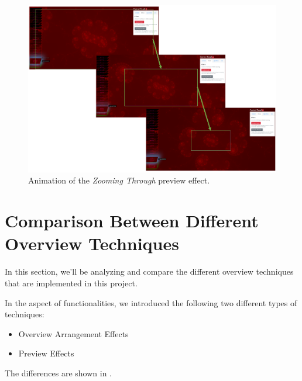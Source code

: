 \begin{figure}[H]
\centering
\includegraphics[width=\textwidth,keepaspectratio]{Figures/Chapter5/zoompreview.png}
\decoRule
\caption[Zooming Through Preview Effect]{Animation of the \emph{Zooming Through} preview effect.}
\label{fig:chap5:zoompreview}
\end{figure}


\section{Comparison Between Different Overview Techniques}

In this section, we'll be analyzing and compare the different overview techniques that are implemented in this project.

In the aspect of functionalities, we introduced the following two different types of techniques:

\begin{itemize}
    \item Overview Arrangement Effects
    \item Preview Effects
\end{itemize}

The differences are shown in .

